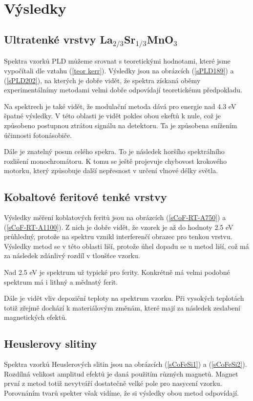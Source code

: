 \chapter{Výsledky}

\section{Ultratenké vrstvy La$_{2/3}$Sr$_{1/3}$MnO$_3$}
Spektra vzorků PLD můžeme srovnat s teoretickými hodnotami, které jsme vypočítali dle vztahu (\ref{teor kerr}). 
Výsledky jsou na obrázcích (\ref{sPLD189}) a (\ref{sPLD202}), na kterých je dobře vidět, že spektra získaná oběmy experimentálnímy 
metodami velmi dobře odpovídají teoretickému předpokladu. 

Na spektrech je také vidět, že modulační metoda 
dává pro energie nad 4.3 eV špatné výsledky. V této oblasti je vidět pokles obou ekeftů k nule, 
což je způsobeno postupnou ztrátou signálu na detektoru. Ta je způsobena 
snížením účinnosti fotonásobiče.

Dále je znatelný posun celého spekra. To je následek horšího spektrálního rozlišení monochromátoru. K tomu se ještě projevuje chybovost krokového motorku, který 
způsobuje další nepřesnost v určení vlnové délky světla.


\section{Kobaltové feritové tenké vrstvy}
Výsledky měření koblatových feritů jsou na obrázcích (\ref{sCoF-RT-A750}) a (\ref{sCoF-RT-A1100}). Z nich je dobře vidět, že vzorek je až do hodnoty 2.5 eV průhledný, protože na spektru vznikl interferenčí obrazec pro tenkou vrstvu. Výsledky metod se v této oblasti liší, protože úhel dopadu se u metod liší, což má za následek zdánlivý rozdíl 
v tloušťce vzorku. 

Nad 2.5 eV je spektrum už typické pro ferity. Konkrétně má velmi podobné spektrum má i lithný a mědnatý ferit. \cite{ferity} 

Dále je vidět vliv depoziční teploty na spektrum vzorku. Při vysokých teplotách totiž zřejmě dochází k materiálovým změnám, které mají za následek zeslabení magnetických efektů.

\section{Heuslerovy slitiny}
Spektra vzorků Heuslerových slitin jsou na obrázcích (\ref{sCoFeSi1}) a (\ref{sCoFeSi2}). Rozdílná velikost amplitud efektů je daná použitím různých magnetů. 
Magnet první z metod totiž nevytváří dostatečně velké pole pro nasycení vzorku. Porovnáním tvarů spekter však vidíme, že si výsledky obou metod odpovídají.


